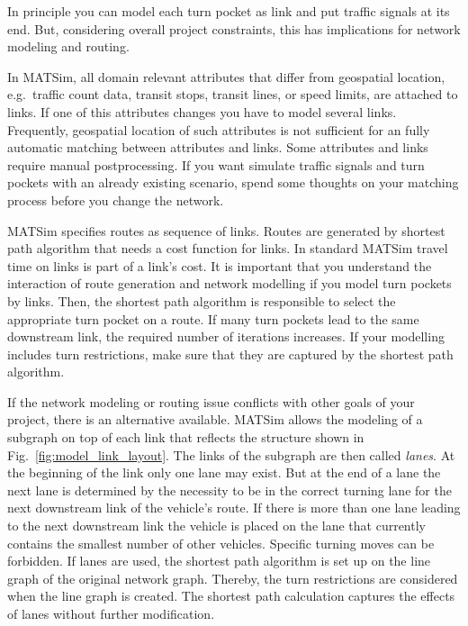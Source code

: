In principle you can model each turn pocket as link and put traffic signals at its end. 
But, considering overall project constraints, this has implications for network modeling and routing. 

In MATSim, all domain relevant attributes that differ from geospatial location, e.g.~traffic count data, transit stops, transit lines, or speed limits, are attached to links. 
If one of this attributes changes you have to model several links. 
Frequently, geospatial location of such attributes is not sufficient for an fully automatic matching between attributes and links. 
Some attributes and links require manual postprocessing. 
If you want simulate traffic signals and turn pockets with an already existing scenario, spend some thoughts on your matching process before you change the network.  

MATSim specifies routes as sequence of links. 
Routes are generated by shortest path algorithm that needs a cost function for links. 
In standard MATSim travel time on links is part of a link's cost. 
It is important that you understand the interaction of route generation and network modelling if you model turn pockets by links. 
Then, the shortest path algorithm is responsible to select the appropriate turn pocket on a route. 
If many turn pockets lead to the same downstream link, the required number of iterations increases. 
If your modelling includes turn restrictions, make sure that they are captured by the shortest path algorithm. 

If the network modeling or routing issue conflicts with other goals of your project, there is an alternative available. 
MATSim allows the modeling of a subgraph on top of each link that reflects the structure shown in Fig.~\ref{fig:model_link_layout}. 
The links of the subgraph are then called \emph{lanes}. 
At the beginning of the link only one lane may exist. 
But at the end of a lane the next lane is determined by the necessity to be in the correct turning lane for the next downstream link of the vehicle's route. 
If there is more than one lane leading to the next downstream link the vehicle is placed on the lane that currently contains the smallest number of other vehicles. %
Specific turning moves can be forbidden. 
If lanes are used, the shortest path algorithm is set up on the line graph of the original network graph.  
Thereby, the turn restrictions are considered when the line graph is created. 
The shortest path calculation captures the effects of lanes without further modification. 

